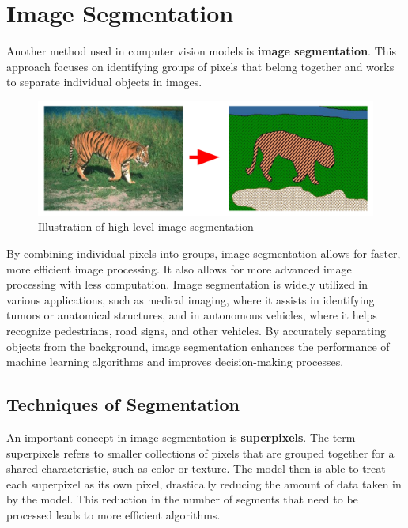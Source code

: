 \section{Image Segmentation}
\begin{flushleft}
    \large Another method used in computer vision models is \textbf{image segmentation}. This approach focuses on identifying groups of pixels that belong together and works to separate individual objects in images. 
    \begin{figure}[H]
        \centering
        \includegraphics[width=0.75\linewidth]{cv/segmentation-tiger.png}
        \caption{Illustration of high-level image segmentation}
        \label{fig:segmentation-tiger}
    \end{figure}

    By combining individual pixels into groups, image segmentation allows for faster, more efficient image processing. It also allows for more advanced image processing with less computation. Image segmentation is widely utilized in various applications, such as medical imaging, where it assists in identifying tumors or anatomical structures, and in autonomous vehicles, where it helps recognize pedestrians, road signs, and other vehicles. By accurately separating objects from the background, image segmentation enhances the performance of machine learning algorithms and improves decision-making processes. 

    \subsection{Techniques of Segmentation}
    An important concept in image segmentation is \textbf{superpixels}. The term superpixels refers to smaller collections of pixels that are grouped together for a shared characteristic, such as color or texture. The model then is able to treat each superpixel as its own pixel, drastically reducing the amount of data taken in by the model. This reduction in the number of segments that need to be processed leads to more efficient algorithms. \newline


\end{flushleft}
